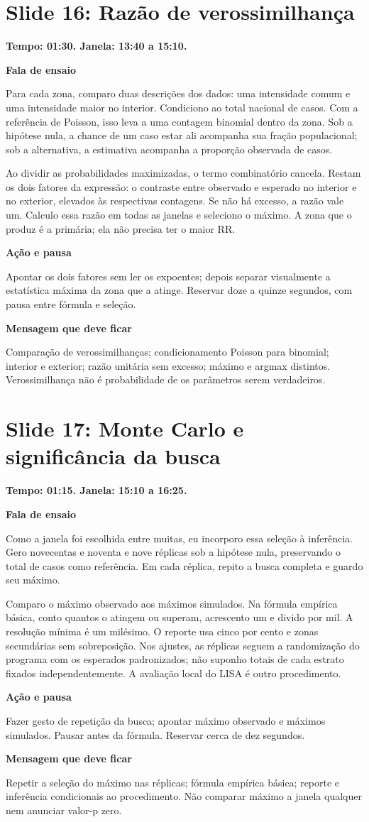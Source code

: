 \documentclass[11pt,a4paper]{article}
\newcommand{\bloco}[1]{\par\Needspace{3\baselineskip}\textbf{#1}\par}
\newcommand{\slide}[2]{\Needspace{13\baselineskip}\section*{Slide #1: #2}}
\begin{document}
\par\begin{minipage}{\textwidth}
\slide{16}{Razão de verossimilhança}
{\color{azul}\textbf{Tempo: 01:30. Janela: 13:40 a 15:10.}}\par
\bloco{Fala de ensaio}
Para cada zona, comparo duas descrições dos dados: uma intensidade comum e uma intensidade maior no interior. Condiciono ao total nacional de casos. Com a referência de Poisson, isso leva a uma contagem binomial dentro da zona. Sob a hipótese nula, a chance de um caso estar ali acompanha sua fração populacional; sob a alternativa, a estimativa acompanha a proporção observada de casos.

Ao dividir as probabilidades maximizadas, o termo combinatório cancela. Restam os dois fatores da expressão: o contraste entre observado e esperado no interior e no exterior, elevados às respectivas contagens. Se não há excesso, a razão vale um. Calculo essa razão em todas as janelas e seleciono o máximo. A zona que o produz é a primária; ela não precisa ter o maior RR.
\bloco{Ação e pausa}
Apontar os dois fatores sem ler os expoentes; depois separar visualmente a estatística máxima da zona que a atinge. Reservar doze a quinze segundos, com pausa entre fórmula e seleção.
\bloco{Mensagem que deve ficar}
Comparação de verossimilhanças; condicionamento Poisson para binomial; interior e exterior; razão unitária sem excesso; máximo e argmax distintos. Verossimilhança não é probabilidade de os parâmetros serem verdadeiros.
\end{minipage}\par\bigskip
\par\begin{minipage}{\textwidth}
\slide{17}{Monte Carlo e significância da busca}
{\color{azul}\textbf{Tempo: 01:15. Janela: 15:10 a 16:25.}}\par
\bloco{Fala de ensaio}
Como a janela foi escolhida entre muitas, eu incorporo essa seleção à inferência. Gero novecentas e noventa e nove réplicas sob a hipótese nula, preservando o total de casos como referência. Em cada réplica, repito a busca completa e guardo seu máximo.

Comparo o máximo observado aos máximos simulados. Na fórmula empírica básica, conto quantos o atingem ou superam, acrescento um e divido por mil. A resolução mínima é um milésimo. O reporte usa cinco por cento e zonas secundárias sem sobreposição. Nos ajustes, as réplicas seguem a randomização do programa com os esperados padronizados; não suponho totais de cada estrato fixados independentemente. A avaliação local do LISA é outro procedimento.
\bloco{Ação e pausa}
Fazer gesto de repetição da busca; apontar máximo observado e máximos simulados. Pausar antes da fórmula. Reservar cerca de dez segundos.
\bloco{Mensagem que deve ficar}
Repetir a seleção do máximo nas réplicas; fórmula empírica básica; reporte e inferência condicionais ao procedimento. Não comparar máximo a janela qualquer nem anunciar valor-p zero.
\end{minipage}\par\bigskip
\end{document}
